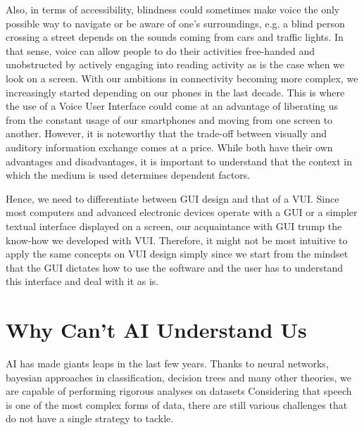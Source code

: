 Also, in terms of accessibility, blindness could sometimes make voice the only possible way to navigate or be aware of one's surroundings, e.g. a blind person crossing a street depends on the sounds coming from cars and traffic lights.
In that sense, voice can allow people to do their activities free-handed and unobstructed by actively engaging into reading activity %
as is the case when we look on a screen.
With our ambitions in connectivity becoming more complex, we %
increasingly started depending on our phones in the last decade.
This is where the use of a Voice User Interface could come at an advantage of liberating us from the constant usage of our smartphones and moving from one screen to another. 
However, it is noteworthy that the trade-off between visually and auditory information exchange comes at a price. While both have their own advantages and disadvantages, it is important to understand that the context in which the medium is used determines dependent factors.

Hence, we need to differentiate between GUI design and that of a VUI. Since most computers and advanced electronic devices operate with a GUI or a simpler textual interface displayed on a screen, our acquaintance with GUI trump the know-how we developed with VUI. %
Therefore, it might not be most intuitive to apply the same concepts on VUI design simply since we start from the mindset that the GUI dictates how to use the software and the user has to understand this interface and deal with it as is.







\section{Why Can't AI Understand Us}

AI has made giants leaps in the last few years. Thanks to neural networks, bayesian approaches in classification, decision trees and many other theories, we are capable of performing rigorous analyses on datasets
Considering that speech is one of the most complex forms of data, there are still various challenges that do not have a single strategy to tackle.

